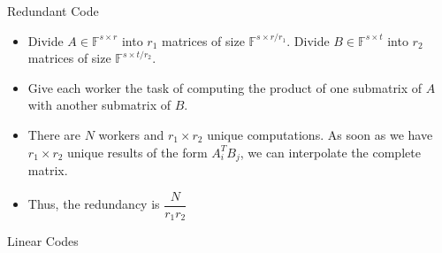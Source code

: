 \documentclass{beamer}
\begin{document}
\begin{frame}{Redundant Code}
    \begin{itemize}
        \item Divide $A \in \mathbb{F}^{s \times r}$ into $r_{1}$ matrices of size $\mathbb{F}^{s\times r / r_{1}}$. Divide $B \in \mathbb{F}^{s \times t}$ into $r_{2}$ matrices of size $\mathbb{F}^{s \times t / r_{2}}$. 
        \item Give each worker the task of computing the product of one submatrix of $A$ with another submatrix of $B$.
        \item There are $N$ workers and $r_{1} \times r_{2}$ unique computations. As soon as we have $r_{1} \times r_{2}$ unique results of the form $A^T_iB_j$, we can interpolate the complete matrix.
        \item Thus, the redundancy is $\dfrac{N}{r_{1} r_{2}}$
    \end{itemize}
\end{frame}

\begin{frame}{Linear Codes}
\end{frame}
\end{document}
